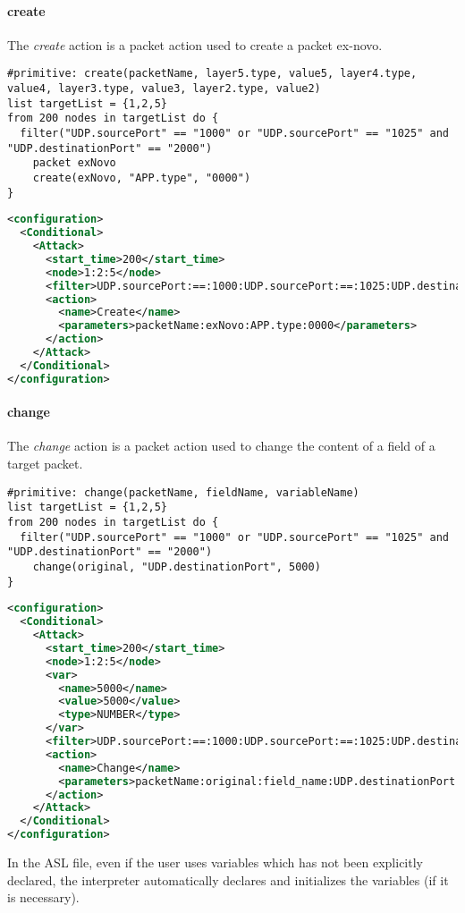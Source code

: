\paragraph{create}
The \emph{create} action is a packet action used to create a packet ex-novo.
%
\begin{lstlisting}[language={asl},caption={ASL create example}]
#primitive: create(packetName, layer5.type, value5, layer4.type, value4, layer3.type, value3, layer2.type, value2)
list targetList = {1,2,5}
from 200 nodes in targetList do {
  filter("UDP.sourcePort" == "1000" or "UDP.sourcePort" == "1025" and "UDP.destinationPort" == "2000")
    packet exNovo
    create(exNovo, "APP.type", "0000")
}
\end{lstlisting}
%
\begin{lstlisting}[language={xml},caption={Interpreter output}]
<configuration>
  <Conditional>
    <Attack>
      <start_time>200</start_time>
      <node>1:2:5</node>
      <filter>UDP.sourcePort:==:1000:UDP.sourcePort:==:1025:UDP.destinationPort:==:2000:AND:OR</filter>
      <action>
        <name>Create</name>
        <parameters>packetName:exNovo:APP.type:0000</parameters>
      </action>
    </Attack>
  </Conditional>
</configuration>
\end{lstlisting}

\paragraph{change}
The \emph{change} action is a packet action used to change the content of a field of a target packet.
%
\begin{lstlisting}[language={asl},caption={ASL change example}]
#primitive: change(packetName, fieldName, variableName)
list targetList = {1,2,5}
from 200 nodes in targetList do {
  filter("UDP.sourcePort" == "1000" or "UDP.sourcePort" == "1025" and "UDP.destinationPort" == "2000")
    change(original, "UDP.destinationPort", 5000)
}
\end{lstlisting}
%
\begin{lstlisting}[language={xml},caption={Interpreter output}]
<configuration>
  <Conditional>
    <Attack>
      <start_time>200</start_time>
      <node>1:2:5</node>
      <var>
        <name>5000</name>
        <value>5000</value>
        <type>NUMBER</type>
      </var>
      <filter>UDP.sourcePort:==:1000:UDP.sourcePort:==:1025:UDP.destinationPort:==:2000:AND:OR</filter>
      <action>
        <name>Change</name>
        <parameters>packetName:original:field_name:UDP.destinationPort:value:5000</parameters>
      </action>
    </Attack>
  </Conditional>
</configuration>
\end{lstlisting}
%
In the ASL file, even if the user uses variables which has not been explicitly declared, the interpreter automatically declares and initializes the variables (if it is necessary).

